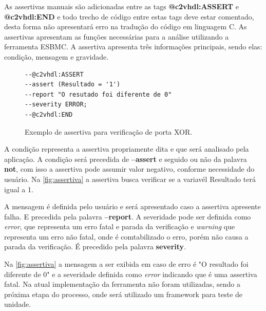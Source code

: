 \par
\label{sec:assertiva_descricao} As assertivas manuais são adicionadas entre as tags \textbf{@c2vhdl:ASSERT} e \textbf{@c2vhdl:END} e todo trecho de código entre estas tags deve estar comentado, desta forma não apresentará erro na tradução do código em linguagem C. As assertivas apresentam as funções necessárias para a análise utilizando a ferramenta ESBMC. A assertiva apresenta três informações principais, sendo elas: condição, mensagem e gravidade.

\begin{figure}[H]
\caption{\label{fig:assertiva} Exemplo de assertiva para verificação de porta XOR.}
	\begin{center}
    \begin{minipage}{0.99\textwidth}
    \begin{lstlisting}       
--@c2vhdl:ASSERT
--assert (Resultado = '1')
--report "O resutado foi diferente de 0"
--severity ERROR;
--@c2vhdl:END
    \end{lstlisting}
    \end{minipage}
	\end{center}
\end{figure}

\par
A condição representa a assertiva propriamente dita e que será analisado pela aplicação. A condição será precedida de \textbf{--assert} e seguido ou não da palavra \textbf{not}, com isso a assertiva pode assumir valor negativo, conforme necessidade do usuário. Na \autoref{fig:assertiva} a assertiva busca verificar se a variavél Resultado terá igual a 1. 

\par
A mensagem é definida pelo usuário e será apresentado caso a assertiva apresente falha. E precedida pela palavra \textbf{--report}. A severidade pode ser definida como \textit{error}, que representa um erro fatal e parada da verificação e \textit{warning} que representa um erro não fatal, onde é comtabilizado o erro, porém não causa a parada da verificação. É precedido pela palavra \textbf{severity}.

\par
Na \autoref{fig:assertiva} a mensagem a ser exibida em caso de erro é "O resultado foi diferente de 0" e a severidade definida como \textit{error} indicando que é uma assertiva fatal. Na atual implementação da ferramenta não foram utilizadas, sendo a próxima etapa do processo, onde será utilizado um framework para teste de unidade.

